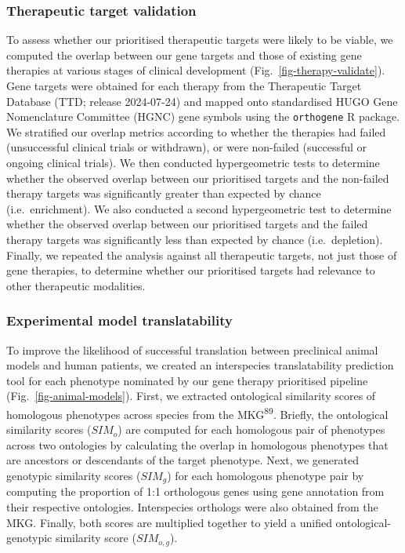\documentclass[
]{article}
\begin{document}
\subsubsection{Therapeutic target
validation}\label{therapeutic-target-validation-1}

To assess whether our prioritised therapeutic targets were likely to be
viable, we computed the overlap between our gene targets and those of
existing gene therapies at various stages of clinical development
(Fig.~\ref{fig-therapy-validate}). Gene targets were obtained for each
therapy from the Therapeutic Target Database (TTD; release 2024-07-24)
and mapped onto standardised HUGO Gene Nomenclature Committee (HGNC)
gene symbols using the \texttt{orthogene} R package. We stratified our
overlap metrics according to whether the therapies had failed
(unsuccessful clinical trials or withdrawn), or were non-failed
(successful or ongoing clinical trials). We then conducted
hypergeometric tests to determine whether the observed overlap between
our prioritised targets and the non-failed therapy targets was
significantly greater than expected by chance (i.e.~enrichment). We also
conducted a second hypergeometric test to determine whether the observed
overlap between our prioritised targets and the failed therapy targets
was significantly less than expected by chance (i.e.~depletion).
Finally, we repeated the analysis against all therapeutic targets, not
just those of gene therapies, to determine whether our prioritised
targets had relevance to other therapeutic modalities.

\subsubsection{Experimental model
translatability}\label{experimental-model-translatability-1}

To improve the likelihood of successful translation between preclinical
animal models and human patients, we created an interspecies
translatability prediction tool for each phenotype nominated by our gene
therapy prioritised pipeline (Fig.~\ref{fig-animal-models}). First, we
extracted ontological similarity scores of homologous phenotypes across
species from the MKG\textsuperscript{89}. Briefly, the ontological
similarity scores (\(SIM_o\)) are computed for each homologous pair of
phenotypes across two ontologies by calculating the overlap in
homologous phenotypes that are ancestors or descendants of the target
phenotype. Next, we generated genotypic similarity scores (\(SIM_g\))
for each homologous phenotype pair by computing the proportion of 1:1
orthologous genes using gene annotation from their respective
ontologies. Interspecies orthologs were also obtained from the MKG.
Finally, both scores are multiplied together to yield a unified
ontological-genotypic similarity score (\(SIM_{o,g}\)).
\end{document}
